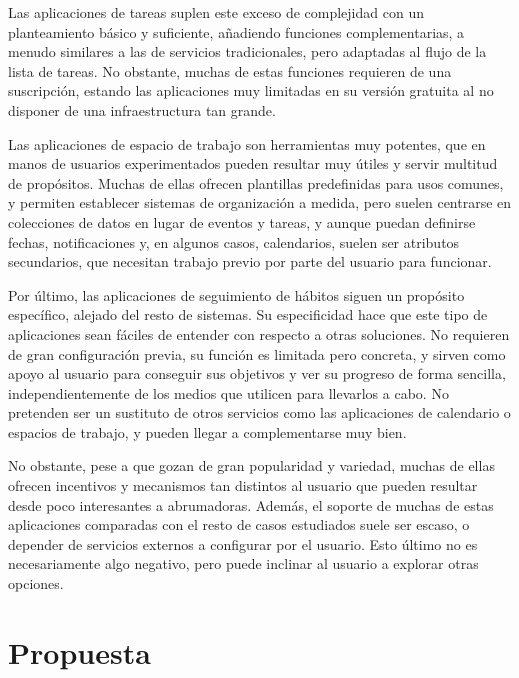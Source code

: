 \documentclass[10pt, a4paper]{aqademic}
\begin{document}
\medskip

Las aplicaciones de tareas suplen este exceso de complejidad con un planteamiento básico y suficiente, añadiendo funciones complementarias, a menudo similares a las de servicios tradicionales, pero adaptadas al flujo de la lista de tareas. No obstante, muchas de estas funciones requieren de una suscripción, estando las aplicaciones muy limitadas en su versión gratuita al no disponer de una infraestructura tan grande. 

\medskip

Las aplicaciones de espacio de trabajo son herramientas muy potentes, que en manos de usuarios experimentados pueden resultar muy útiles y servir multitud de propósitos. Muchas de ellas ofrecen plantillas predefinidas para usos comunes, y permiten establecer sistemas de organización a medida, pero suelen centrarse en colecciones de datos en lugar de eventos y tareas, y aunque puedan definirse fechas, notificaciones y, en algunos casos, calendarios, suelen ser atributos secundarios, que necesitan trabajo previo por parte del usuario para funcionar.

\medskip

Por último, las aplicaciones de seguimiento de hábitos siguen un propósito específico, alejado del resto de sistemas. Su especificidad hace que este tipo de aplicaciones sean fáciles de entender con respecto a otras soluciones. No requieren de gran configuración previa, su función es limitada pero concreta, y sirven como apoyo al usuario para conseguir sus objetivos y ver su progreso de forma sencilla, independientemente de los medios que utilicen para llevarlos a cabo. No pretenden ser un sustituto de otros servicios como las aplicaciones de calendario o espacios de trabajo, y pueden llegar a complementarse muy bien.

No obstante, pese a que gozan de gran popularidad y variedad, muchas de ellas ofrecen incentivos y mecanismos tan distintos al usuario que pueden resultar desde poco interesantes a abrumadoras. Además, el soporte de muchas de estas aplicaciones comparadas con el resto de casos estudiados suele ser escaso, o depender de servicios externos a configurar por el usuario. Esto último no es necesariamente algo negativo, pero puede inclinar al usuario a explorar otras opciones.




\section{Propuesta}
\end{document}
